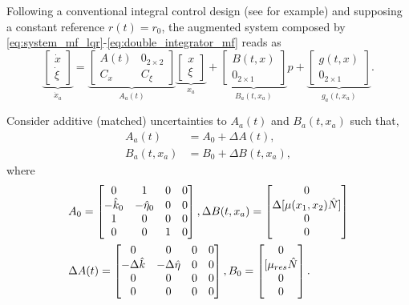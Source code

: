 \documentclass[journal,twoside,web]{ieeecolor}
\begin{document}
Following a conventional integral control design (see \cite[Chapter 12]{b:Khalil2002} for example) and supposing a constant reference $r(t)=r_0$, the augmented system composed by \eqref{eq:system_mf_lqr}-\eqref{eq:double_integrator_mf} reads as
\begin{equation}
\displaystyle
\underbrace{\begin{bmatrix}
\dot{x} \\
\dot{\xi}
\end{bmatrix}}_{\dot{x}_a} = 
\underbrace{\begin{bmatrix}
A(t) &  0_{2\times 2} \\
C_x & C_\xi
\end{bmatrix}}_{A_a(t)}
\underbrace{\begin{bmatrix}
x \\
\xi
\end{bmatrix}}_{x_a} + 
\underbrace{\begin{bmatrix}
B(t,x) \\
0_{2\times 1}
\end{bmatrix}}_{B_a(t,x_a)} 
p +
\underbrace{\begin{bmatrix}
g(t,x) \\
0_{2\times 1} %
\end{bmatrix}}_{g_a(t,x_a)}.
\label{eq:system_augm_lqr}
\end{equation}

Consider additive (matched) uncertainties to $A_a(t)$ and $B_a(t,x_a)$ such that,
\begin{align}\label{eq:DA}
\displaystyle
A_a(t) &= A_0 + \Delta A(t), \\
B_a(t,x_a) &= B_0 + \Delta B(t,x_a),
\label{eq:DB}
\end{align} 
where
{\small
\begin{align*}
\displaystyle
&A_0 =
\begin{bmatrix}
0 & 1 & 0 & 0 \\
-\hat{k}_0 & -\hat{\eta}_0 & 0 & 0 \\
1 & 0 & 0 & 0 \\
0 & 0 & 1 & 0
\end{bmatrix}, 
\Delta B (t,x_a) = \begin{bmatrix}
0 \\
\Delta [\mu(x_1,x_2) \hat{N}] \\
0 \\
0
\end{bmatrix} \\
&\Delta A(t) =
\begin{bmatrix}
0 & 0 & 0 & 0 \\
-\Delta \hat{k} & -\Delta \hat{\eta} & 0 & 0 \\
0 & 0 & 0 & 0 \\
0 & 0 & 0 & 0
\end{bmatrix}, 
B_0 = \begin{bmatrix}
0 \\
[\mu_{res} \hat{N} \\
0 \\
0
\end{bmatrix}.
\end{align*}}
\end{document}
